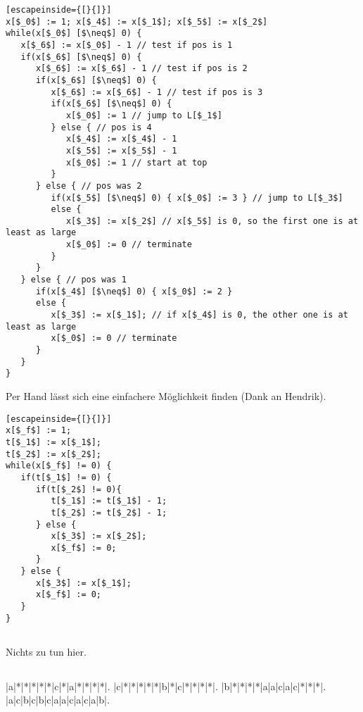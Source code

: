 \documentclass{article}
\begin{document}
\begin{lstlisting}[escapeinside={[}{]}]
x[$_0$] := 1; x[$_4$] := x[$_1$]; x[$_5$] := x[$_2$]
while(x[$_0$] [$\neq$] 0) {
   x[$_6$] := x[$_0$] - 1 // test if pos is 1
   if(x[$_6$] [$\neq$] 0) {
      x[$_6$] := x[$_6$] - 1 // test if pos is 2
      if(x[$_6$] [$\neq$] 0) {
         x[$_6$] := x[$_6$] - 1 // test if pos is 3
         if(x[$_6$] [$\neq$] 0) {
            x[$_0$] := 1 // jump to L[$_1$]
         } else { // pos is 4
            x[$_4$] := x[$_4$] - 1
            x[$_5$] := x[$_5$] - 1
            x[$_0$] := 1 // start at top
         }
      } else { // pos was 2
         if(x[$_5$] [$\neq$] 0) { x[$_0$] := 3 } // jump to L[$_3$]
         else {
            x[$_3$] := x[$_2$] // x[$_5$] is 0, so the first one is at least as large
            x[$_0$] := 0 // terminate
         }
      }
   } else { // pos was 1
      if(x[$_4$] [$\neq$] 0) { x[$_0$] := 2 } 
      else {
         x[$_3$] := x[$_1$]; // if x[$_4$] is 0, the other one is at least as large
         x[$_0$] := 0 // terminate
      }
   }
}
\end{lstlisting}

Per Hand lässt sich eine einfachere Möglichkeit finden (Dank an Hendrik).

\begin{lstlisting}[escapeinside={[}{]}]
x[$_f$] := 1;
t[$_1$] := x[$_1$];
t[$_2$] := x[$_2$];
while(x[$_f$] != 0) {
   if(t[$_1$] != 0) {
      if(t[$_2$] != 0){
         t[$_1$] := t[$_1$] - 1;
         t[$_2$] := t[$_2$] - 1;
      } else {
         x[$_3$] := x[$_2$];
         x[$_f$] := 0;
      }
   } else {
      x[$_3$] := x[$_1$];
      x[$_f$] := 0;
   }
}
\end{lstlisting}

\subsection{} 

Nichts zu tun hier.

\subsection{} 

\begin{minipage}{.4\textwidth}
   \def\PuzzleSolutionContent#1{\makebox(1,1){\itshape{#1}}}
   \renewcommand{\PuzzleLineThickness}{1pt}
   \PuzzleSolution
   \begin{Puzzle}{4}{13}
   |a|*|*|*|*|*|c|*|a|*|*|*|*|.
   |c|*|*|*|*|*|b|*|c|*|*|*|*|.
   |b|*|*|*|*|a|a|c|a|c|*|*|*|.
   |a|c|b|c|b|c|a|a|c|a|c|a|b|.
   \end{Puzzle}
\end{minipage}
\end{document}
